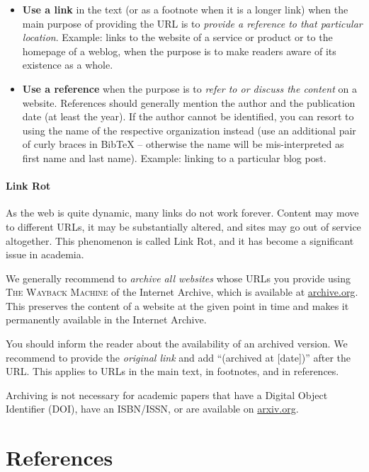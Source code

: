 \begin{itemize}
  \item \textbf{Use a link} in the text (or as a footnote when it is a longer link) when the main purpose of providing the URL is to \emph{provide a reference to that particular location}. Example: links to the website of a service or product or to the homepage of a weblog, when the purpose is to make readers aware of its existence as a whole.
  \item \textbf{Use a reference} when the purpose is to \emph{refer to or discuss the content} on a website. References should generally mention the author and the publication date (at least the year). If the author cannot be identified, you can resort to using the name of the respective organization instead (use an additional pair of curly braces in BibTeX -- otherwise the name will be mis-interpreted as first name and last name). Example: linking to a particular blog post.
\end{itemize}

\paragraph{Link Rot}

As the web is quite dynamic, many links do not work forever. Content may move to different URLs, it may be substantially altered, and sites may go out of service altogether. This phenomenon is called Link Rot, and it has become a significant issue in academia.

We generally recommend to \emph{archive all websites} whose URLs you provide using \textsc{The Wayback Machine} of the Internet Archive, which is available at \url{archive.org}.
This preserves the content of a website at the given point in time and makes it permanently available in the Internet Archive.

You should inform the reader about the availability of an archived version. We recommend to provide the \emph{original link} and add ``(archived at [date])'' after the URL. This applies to URLs in the main text, in footnotes, and in references.

Archiving is not necessary for academic papers that have a Digital Object Identifier (DOI), have an ISBN/ISSN, or are available on \url{arxiv.org}.


\section{References}

